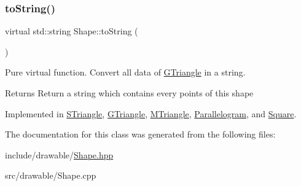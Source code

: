 \subsubsection{\texorpdfstring{to\+String()}{toString()}}
{\footnotesize\ttfamily virtual std\+::string Shape\+::to\+String (\begin{DoxyParamCaption}{ }\end{DoxyParamCaption})\hspace{0.3cm}{\ttfamily [pure virtual]}}



Pure virtual function. Convert all data of \hyperlink{classGTriangle}{G\+Triangle} in a string. 

\begin{DoxyReturn}{Returns}
Return a string which contains every points of this shape 
\end{DoxyReturn}


Implemented in \hyperlink{classSTriangle_a32e4cee65f52d9ee4121c78dc97d86ab}{S\+Triangle}, \hyperlink{classGTriangle_a8381aeea39fac0d52ad9e0d45b791b3b}{G\+Triangle}, \hyperlink{classMTriangle_a7d1fd825592dffa6ac05b3398a8c105a}{M\+Triangle}, \hyperlink{classParallelogram_a9caae0044f23d8a1e87b1a78d852c37f}{Parallelogram}, and \hyperlink{classSquare_aa5d7db8004bba3c400f57513d93b21d4}{Square}.



The documentation for this class was generated from the following files\+:\begin{DoxyCompactItemize}
\item 
include/drawable/\hyperlink{Shape_8hpp}{Shape.\+hpp}\item 
src/drawable/Shape.\+cpp\end{DoxyCompactItemize}
